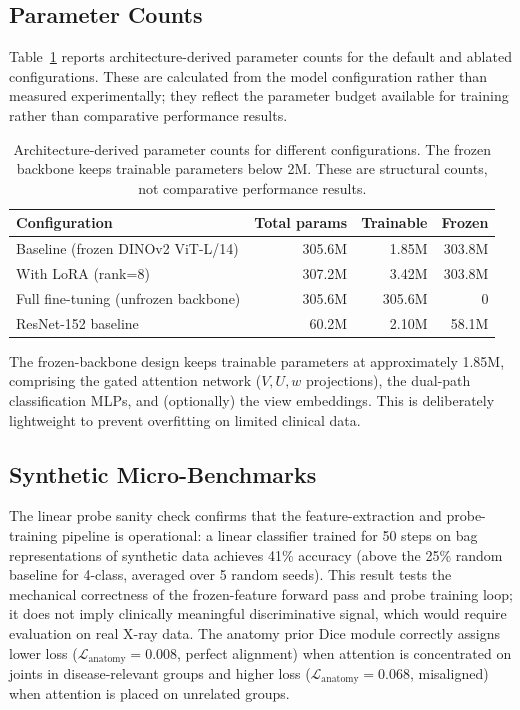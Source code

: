 \documentclass{article}
\begin{document}
\subsection{Parameter Counts}

Table~\ref{tab:params} reports architecture-derived parameter counts for the default and ablated configurations. These are calculated from the model configuration rather than measured experimentally; they reflect the parameter budget available for training rather than comparative performance results.

\begin{table}[h]
\centering
\caption{Architecture-derived parameter counts for different configurations. The frozen backbone keeps trainable parameters below 2M. These are structural counts, not comparative performance results.}
\label{tab:params}
\begin{tabular}{@{}lrrr@{}}
\toprule
\textbf{Configuration} & \textbf{Total params} & \textbf{Trainable} & \textbf{Frozen} \\
\midrule
Baseline (frozen DINOv2 ViT-L/14) & 305.6M & 1.85M & 303.8M \\
With LoRA (rank=8) & 307.2M & 3.42M & 303.8M \\
Full fine-tuning (unfrozen backbone) & 305.6M & 305.6M & 0 \\
ResNet-152 baseline & 60.2M & 2.10M & 58.1M \\
\bottomrule
\end{tabular}
\end{table}


The frozen-backbone design keeps trainable parameters at approximately 1.85M, comprising the gated attention network ($V, U, w$ projections), the dual-path classification MLPs, and (optionally) the view embeddings. This is deliberately lightweight to prevent overfitting on limited clinical data.

\subsection{Synthetic Micro-Benchmarks}

The linear probe sanity check confirms that the feature-extraction and probe-training pipeline is operational: a linear classifier trained for 50 steps on bag representations of synthetic data achieves 41\% accuracy (above the 25\% random baseline for 4-class, averaged over 5 random seeds). This result tests the mechanical correctness of the frozen-feature forward pass and probe training loop; it does not imply clinically meaningful discriminative signal, which would require evaluation on real X-ray data. The anatomy prior Dice module correctly assigns lower loss ($\mathcal{L}_{\text{anatomy}}=0.008$, perfect alignment) when attention is concentrated on joints in disease-relevant groups and higher loss ($\mathcal{L}_{\text{anatomy}}=0.068$, misaligned) when attention is placed on unrelated groups.
\end{document}
